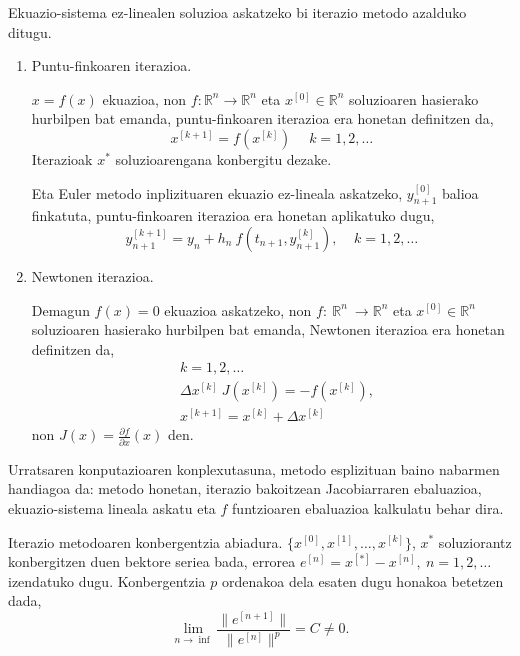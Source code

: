 Ekuazio-sistema ez-linealen soluzioa askatzeko bi iterazio metodo azalduko ditugu.

\begin{enumerate}

\item Puntu-finkoaren iterazioa.

$x=f(x)$ ekuazioa, non $f: {\mathbb{R}}^n  \longrightarrow {\mathbb{R}}^n$ eta  $x^{[0]} \in \mathbb{R}^n$ soluzioaren hasierako hurbilpen bat emanda, puntu-finkoaren iterazioa era honetan definitzen da,
\begin{equation*}
 x^{[k+1]}=f(x^{[k]}) \, \ \ \ \ \ k=1,2,\dots
\end{equation*}
Iterazioak $x^{\ast}$ soluzioarengana konbergitu dezake.

Eta  Euler metodo inplizituaren ekuazio ez-lineala askatzeko, $y_{n+1}^{[0]}$ balioa finkatuta, puntu-finkoaren iterazioa era honetan aplikatuko dugu, 
\begin{equation*}
y_{n+1}^{[k+1]}=y_{n}+h_n \ f(t_{n+1},y_{n+1}^{[k]}), \ \ \ \ \ k=1,2,\dots
\end{equation*}  

\item Newtonen iterazioa.

Demagun $f(x)=0$ ekuazioa askatzeko, non $f: \  {\mathbb{R}}^n \ \longrightarrow {\mathbb{R}}^n$ eta  $x^{[0]} \in \mathbb{R}^n$ soluzioaren hasierako hurbilpen bat emanda, Newtonen iterazioa era honetan definitzen da,
\begin{align*}
&k=1,2,\dots \\
&\Delta x^{[k]} \ J(x^{[k]})=-f(x^{[k]}), \\
&x^{[k+1]}=x^{[k]}+\Delta x^{[k]} 
\end{align*}
non $J(x)=\frac{\partial f}{\partial x} (x)$ den.

\end{enumerate}

Urratsaren konputazioaren konplexutasuna, metodo esplizituan baino nabarmen handiagoa da: metodo honetan, iterazio bakoitzean Jacobiarraren ebaluazioa, ekuazio-sistema lineala askatu eta $f$ funtzioaren ebaluazioa kalkulatu behar dira.

Iterazio metodoaren konbergentzia abiadura. $\{x^{[0]},x^{[1]},\dots,x^{[k]}\}$, $x^{\ast}$ soluziorantz konbergitzen duen bektore seriea bada, errorea $e^{[n]}=x^{[*]}-x^{[n]}, \ n=1,2,\dots$ izendatuko dugu. Konbergentzia $p$ ordenakoa dela esaten dugu honakoa betetzen dada,
\begin{equation*}
\lim\limits_{n\rightarrow \inf} \frac{\|e^{[n+1]}\|}{\|e^{[n]}\|^p}= C \ne 0.
\end{equation*}

